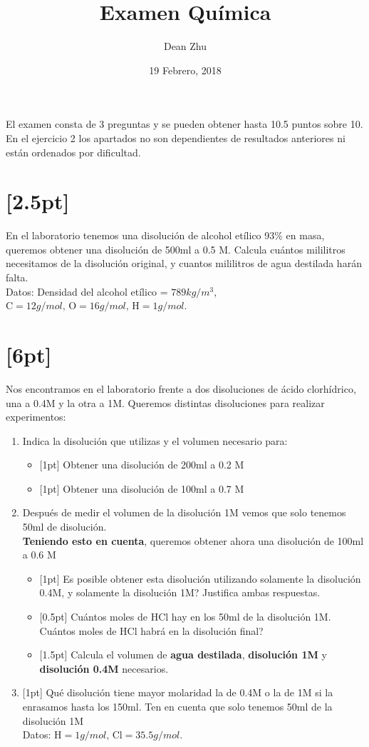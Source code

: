 \documentclass[11pt]{article}
\date{19 Febrero, 2018}
\title{Examen Química}
\author{Dean Zhu}
\begin{document}
\maketitle
\thispagestyle{empty}
El examen consta de 3 preguntas y se pueden obtener hasta 10.5 puntos sobre 10. En el ejercicio 2 los apartados no son dependientes de resultados anteriores ni están ordenados por dificultad. 
\section{[2.5pt]}
\label{sec:org220dcd1}
En el laboratorio tenemos una disolución de alcohol etílico 93\% en masa, queremos obtener una disolución de 500ml a 0.5 M. Calcula cuántos mililitros necesitamos de la disolución original, y cuantos mililitros de agua destilada harán falta. \\
Datos: Densidad del alcohol etílico = \(789kg/m^{3}\), \(\text{C} = 12g/mol \text{, O} = 16g/mol \text{, H} = 1g/mol \).

\section{[6pt]}
\label{sec:org466d254}
Nos encontramos en el laboratorio frente a dos disoluciones de ácido clorhídrico, una a 0.4M y la otra a 1M. Queremos distintas disoluciones para realizar experimentos:
\begin{enumerate}[label=\Alph*)]
\item Indica la disolución que utilizas y el volumen necesario para:

    \begin{itemize}
    \item {[1pt]} Obtener una disolución de 200ml a 0.2 M
    \item {[1pt]} Obtener una disolución de 100ml a 0.7 M
    \end{itemize}
  \item Después de medir el volumen de la disolución 1M vemos que solo tenemos 50ml de disolución. \\
    \textbf{Teniendo esto en cuenta}, queremos obtener ahora una disolución de 100ml a 0.6 M
    \begin{itemize}
    \item {[1pt]} Es posible obtener esta disolución utilizando solamente la disolución 0.4M, y solamente la disolución 1M? Justifica ambas respuestas.
    \item {[0.5pt]} Cuántos moles de HCl hay en los 50ml de la disolución 1M. Cuántos moles de HCl habrá en la disolución final?
    \item {[1.5pt]} Calcula el volumen de \textbf{agua destilada}, \textbf{disolución 1M} y \textbf{disolución 0.4M} necesarios.  \\
    \end{itemize}
  \item {[1pt]} Qué disolución tiene mayor molaridad la de 0.4M o la de 1M si la enrasamos hasta los 150ml. Ten en cuenta que solo tenemos 50ml de la disolución 1M \\
      Datos: \(\text{H} = 1g/mol \text{, Cl} = 35.5g/mol \).
  \end{enumerate}
\end{document}
